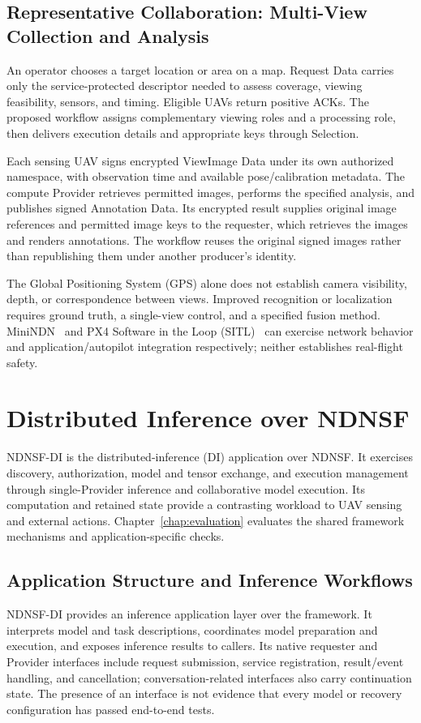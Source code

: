 

\section{Representative Collaboration: Multi-View Collection and Analysis}
An operator chooses a target location or area on a map. Request Data carries only the service-protected descriptor needed to assess coverage, viewing feasibility, sensors, and timing. Eligible UAVs return positive ACKs. The proposed workflow assigns complementary viewing roles and a processing role, then delivers execution details and appropriate keys through Selection.

Each sensing UAV signs encrypted ViewImage Data under its own authorized namespace, with observation time and available pose/calibration metadata. The compute Provider retrieves permitted images, performs the specified analysis, and publishes signed Annotation Data. Its encrypted result supplies original image references and permitted image keys to the requester, which retrieves the images and renders annotations. The workflow reuses the original signed images rather than republishing them under another producer's identity.

The Global Positioning System (GPS) alone does not establish camera visibility, depth, or correspondence between views. Improved recognition or localization requires ground truth, a single-view control, and a specified fusion method. MiniNDN~\cite{minindn} and PX4 Software in the Loop (SITL)~\cite{px4} can exercise network behavior and application/autopilot integration respectively; neither establishes real-flight safety.

\chapter{Distributed Inference over NDNSF}
\label{chap:di}
NDNSF-DI is the distributed-inference (DI) application over NDNSF. It exercises discovery, authorization, model and tensor exchange, and execution management through single-Provider inference and collaborative model execution. Its computation and retained state provide a contrasting workload to UAV sensing and external actions. Chapter~\ref{chap:evaluation} evaluates the shared framework mechanisms and application-specific checks.

\section{Application Structure and Inference Workflows}
NDNSF-DI provides an inference application layer over the framework. It interprets model and task descriptions, coordinates model preparation and execution, and exposes inference results to callers. Its native requester and Provider interfaces include request submission, service registration, result/event handling, and cancellation; conversation-related interfaces also carry continuation state. The presence of an interface is not evidence that every model or recovery configuration has passed end-to-end tests.

